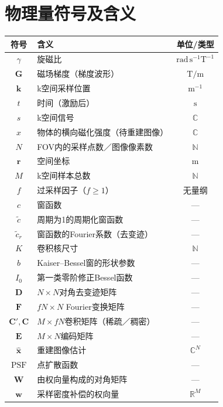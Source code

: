\documentclass[12pt]{article}
\begin{document}
\section{物理量符号及含义}
\begin{table}[h]
    \small
    \centering
    \begin{tabularx}{\textwidth}{c X c}
        \toprule
        \textbf{符号} & \textbf{含义} & \textbf{单位/类型} \\
        \midrule
        $\gamma$ & 旋磁比 & $\mathrm{rad}\,\mathrm{s}^{-1}\mathrm{T}^{-1}$ \\
        $\bm{G}$ & 磁场梯度（梯度波形） & $\mathrm{T}/\mathrm{m}$ \\
        $\bm{k}$ & k空间采样位置 & $\mathrm{m}^{-1}$ \\
        $t$ & 时间（激励后） & $\mathrm{s}$ \\
        $s$ & k空间信号 & $\mathbb{C}$ \\
        $x$ & 物体的横向磁化强度（待重建图像） & $\mathbb{C}$ \\
        $N$ & FOV内的采样点数／图像像素数 & $\mathbb{N}$ \\
        $\bm{r}$ & 空间坐标 & $\mathrm{m}$ \\
        $M$ & k空间样本总数 & $\mathbb{N}$ \\
        $f$ & 过采样因子（$f\ge 1$） & 无量纲 \\
        $c$ & 窗函数 & --- \\
        $\tilde{c}$ & 周期为1的周期化窗函数 & --- \\
        $\tilde{c}_r$ & 窗函数的Fourier系数（去变迹） & --- \\
        $K$ & 卷积核尺寸 & $\mathbb{N}$ \\
        $b$ & Kaiser--Bessel窗的形状参数 & --- \\
        $I_0$ & 第一类零阶修正Bessel函数 & --- \\
        $\mathbf{D}$ & $N\times N$对角去变迹矩阵 & --- \\
        $\mathbf{F}$ & $fN\times N$ Fourier变换矩阵 & --- \\
        $\mathbf{C}',\mathbf{C}$ & $M\times fN$卷积矩阵（稀疏／稠密） & --- \\
        $\mathbf{E}$ & $M\times N$编码矩阵 & --- \\
        $\hat{\bm{x}}$ & 重建图像估计 & $\mathbb{C}^N$ \\
        $\operatorname{PSF}$ & 点扩散函数 & --- \\
        $\mathbf{W}$ & 由权向量构成的对角矩阵 & --- \\
        $\bm{w}$ & 采样密度补偿的权向量 & $\mathbb{R}^M$ \\
        \bottomrule
    \end{tabularx}
\end{table}
\end{document}
